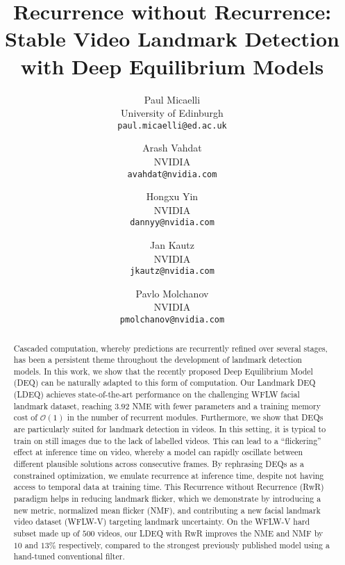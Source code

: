 \documentclass[10pt,twocolumn,letterpaper]{article}
\begin{document}
\title{Recurrence without Recurrence: \\Stable Video Landmark Detection with Deep Equilibrium Models}

\author{Paul Micaelli\\
University of Edinburgh\\
{\tt\small paul.micaelli@ed.ac.uk}
\and
Arash Vahdat\\
NVIDIA\\
{\tt\small avahdat@nvidia.com}
\and
Hongxu Yin\\
NVIDIA\\
{\tt\small dannyy@nvidia.com}
\and
Jan Kautz\\
NVIDIA\\
{\tt\small jkautz@nvidia.com}
\and
Pavlo Molchanov\\
NVIDIA\\
{\tt\small pmolchanov@nvidia.com}
}
\maketitle

\newcommand\paul[1]{\textcolor{blue}{[Paul: #1]}}
\newcommand\JK[1]{\textcolor{magenta}{[JK: #1]}}
\newcommand\yin[1]{\textcolor{cyan}{[yin: #1]}}


\begin{abstract}

Cascaded computation, whereby predictions are recurrently refined over several stages, has been a persistent theme throughout the development of landmark detection models. In this work, we show that the recently proposed Deep Equilibrium Model (DEQ) can be naturally adapted to this form of computation. Our Landmark DEQ (LDEQ) achieves state-of-the-art performance on the challenging WFLW facial landmark dataset, reaching $3.92$ NME with fewer parameters and a training memory cost of $\mathcal{O}(1)$ in the number of recurrent modules. Furthermore, we show that DEQs are particularly suited for landmark detection in videos. In this setting, it is typical to train on still images due to the lack of labelled videos. This can lead to a ``flickering'' effect at inference time on video, whereby a model can rapidly oscillate between different plausible solutions across consecutive frames. By rephrasing DEQs as a constrained optimization, we emulate recurrence at inference time, despite not having access to temporal data at training time. This Recurrence without Recurrence (RwR) paradigm helps in reducing landmark flicker, which we demonstrate by introducing a new metric, normalized mean flicker (NMF), and contributing a new facial landmark video dataset (WFLW-V) targeting landmark uncertainty. On the WFLW-V hard subset made up of $500$ videos, our LDEQ with RwR improves the NME and NMF by $10$ and $13\%$ respectively, compared to the strongest previously published model using a hand-tuned conventional filter. 

\end{abstract}
\end{document}
